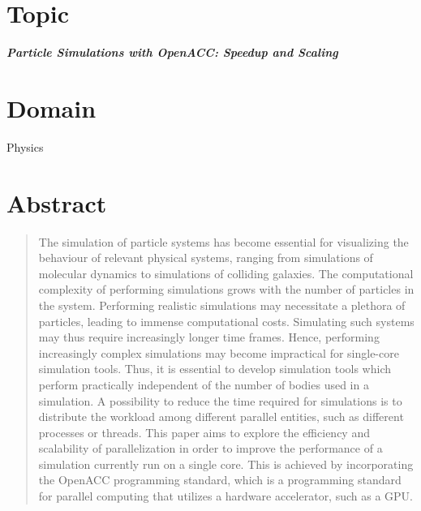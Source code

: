 \documentclass[unicode,11pt,a4paper,oneside,numbers=endperiod,openany]{scrartcl}
\begin{document}
\setassignment


\newline

\section{Topic}
\large{\textit{\textbf{Particle Simulations with OpenACC: Speedup and Scaling}}}
\section{Domain}
Physics


\section{Abstract}
\begin{abstract}
The simulation of particle systems has become essential for visualizing the behaviour of relevant physical systems, ranging from simulations of molecular dynamics to simulations of colliding galaxies. The computational complexity of performing simulations grows with the number of particles in the system. Performing realistic simulations may necessitate a plethora of particles, leading to immense computational costs. Simulating such systems may thus require increasingly longer time frames. Hence, performing increasingly complex simulations may become impractical for single-core simulation tools. Thus, it is essential to develop simulation tools which perform practically independent of the number of bodies used in a simulation. A possibility to reduce the time required for simulations is to distribute the workload among different parallel entities, such as different processes or threads. This paper aims to explore the efficiency and scalability of parallelization in order to improve the performance of a simulation currently run on a single core. This is achieved by incorporating the OpenACC programming standard, which is a programming standard for parallel computing that utilizes a hardware accelerator, such as a GPU. 

\end{abstract}
\end{document}
